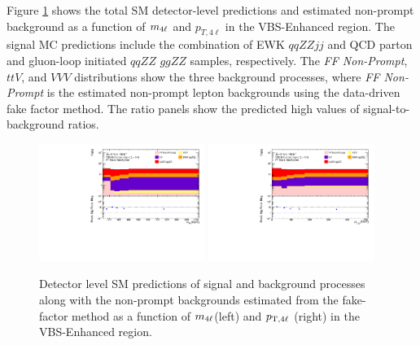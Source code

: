 Figure \ref{fig:MCFFRedStack} shows the total SM detector-level predictions and estimated non-prompt background as a function of $m_{4\ell}$ and $p_{T,4\ell}$ in the VBS-Enhanced region. The signal MC predictions include the combination of EWK $qqZZjj$ and QCD parton and gluon-loop initiated $qqZZ$ $ggZZ$ samples, respectively. The \textit{FF Non-Prompt}, $ttV$, and $VVV$ distributions show the three background processes, where  \textit{FF Non-Prompt} is the estimated non-prompt lepton backgrounds using the data-driven fake factor method. The ratio panels show the predicted high values of signal-to-background ratios. 

\begin{figure}[!htbp]
    \centering
    \includegraphics[width=0.48\textwidth]{figures/Analysis/Background/RedStack_VBSEnhanced_M4l.pdf}
    \includegraphics[width=0.48\textwidth]{figures/Analysis/Background/RedStack_VBSEnhanced_Pt4l.pdf}
    \caption{ Detector level SM predictions of signal and background processes along with the non-prompt backgrounds estimated from the fake-factor method as a function of $m_{4\ell}$(left) and $p_{\textrm{T} ,4\ell}$ (right) in the VBS-Enhanced region. \label{fig:MCFFRedStack} }
\end{figure}